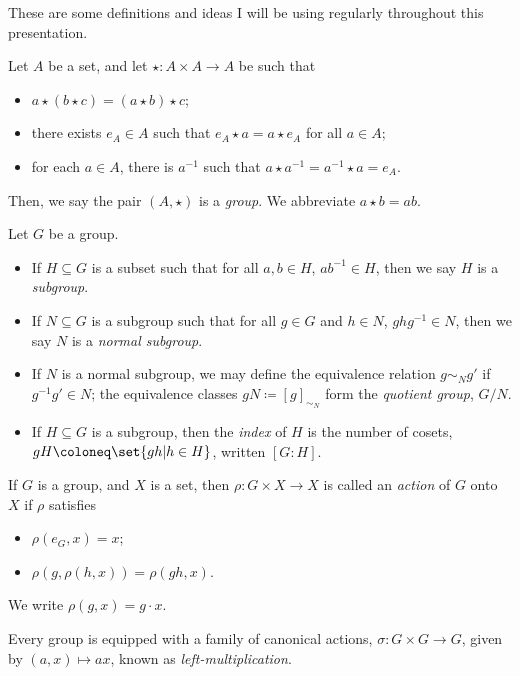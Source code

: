\documentclass[10pt]{mypackage}
\begin{document}
\RaggedRight
These are some definitions and ideas I will be using regularly throughout this presentation.
\begin{definition}[Groups]
  Let $A$ be a set, and let $\star\colon A\times A \rightarrow A$ be such that
  \begin{itemize}
    \item $a\star\left( b\star c \right) = \left( a\star b \right)\star c$;
    \item there exists $e_A\in A$ such that $e_A\star a = a\star e_A$ for all $a\in A$;
    \item for each $a\in A$, there is $a^{-1}$ such that $a\star a^{-1} = a^{-1}\star a = e_{A}$.
  \end{itemize}
  Then, we say the pair $\left( A,\star \right)$ is a \textit{group}. We abbreviate $a\star b = ab$.
\end{definition}
\begin{definition}
  Let $G$ be a group.
  \begin{itemize}
    \item If $H\subseteq G$ is a subset such that for all $a,b\in H$, $ab^{-1}\in H$, then we say $H$ is a \textit{subgroup}.
    \item If $N\subseteq G$ is a subgroup such that for all $g\in G$ and $h\in N$, $ghg^{-1}\in N$, then we say $N$ is a \textit{normal subgroup}.
    \item If $N$ is a normal subgroup, we may define the equivalence relation $g\sim_{N}g'$  if $g^{-1}g'\in N$; the equivalence classes $gN\coloneq \left[ g \right]_{\sim_N}$ form the \textit{quotient group}, $G/N$.
    \item If $H\subseteq G$ is a subgroup, then the \textit{index} of $H$ is the number of cosets, $gH\coloneq \set{gh | h\in H}$, written $\left[ G:H \right]$.
  \end{itemize}
\end{definition}
\begin{definition}
  If $G$ is a group, and $X$ is a set, then $\rho\colon G\times X\rightarrow X$ is called an \textit{action} of $G$ onto $X$ if $\rho$ satisfies
  \begin{itemize}
    \item $\rho\left( e_G,x \right) = x$;
    \item $\rho\left( g,\rho\left( h,x \right) \right) = \rho\left( gh,x \right)$.
  \end{itemize}
  We write $\rho\left( g,x \right) = g\cdot x$.\newline

  Every group is equipped with a family of canonical actions, $\sigma\colon G\times G \rightarrow G$, given by $\left( a,x \right)\mapsto ax$, known as \textit{left-multiplication}.
\end{definition}
\end{document}
